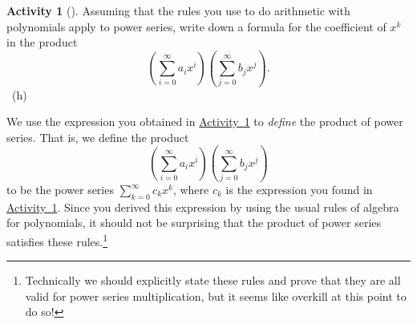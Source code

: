 \documentclass[10pt,]{book}
\theoremstyle{plain}
\theoremstyle{definition}
\theoremstyle{definition}
\theoremstyle{definition}
\newtheorem{activity}[project]{Activity}
\numberwithin{equation}{chapter}
\begin{document}
\begin{activity}[]\label{coeffinpowerseries}
\hypertarget{p-1293}{}%
Assuming that the rules you use to do arithmetic with polynomials apply to power series, write down a formula for the coefficient of \(x^k\) in the product%
\begin{equation*}
\left(\sum_{i=0}^\infty a_ix^i\right)\left(\sum_{j=0}^\infty
b_jx^j\right)\text{.}
\end{equation*}
%
~{\tiny (h)}\end{activity}
\hypertarget{p-1296}{}%
We use the expression you obtained in \hyperref[coeffinpowerseries]{Activity~\ref{coeffinpowerseries}} to \emph{define} the product of power series. That is, we define the product%
\begin{equation*}
\left(\sum_{i=0}^\infty a_ix^i\right)\left(\sum_{j=0}^\infty
b_jx^j\right)
\end{equation*}
to be the power series \(\sum_{k=0}^\infty c_k x^k\), where \(c_k\) is the expression you found in \hyperref[coeffinpowerseries]{Activity~\ref{coeffinpowerseries}}. Since you derived this expression by using the usual rules of algebra for polynomials, it should not be surprising that the product of power series satisfies these rules.\footnote{Technically we should explicitly state these rules and prove that they are all valid for power series multiplication, but it seems like overkill at this point to do so!\label{fn-16}}%
\typeout{************************************************}
\typeout{************************************************}
\end{document}
